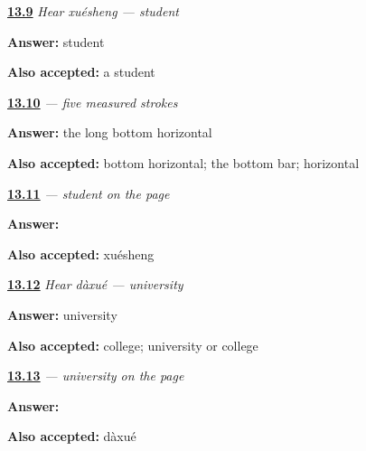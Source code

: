\noindent\begin{minipage}[t]{\linewidth}
\raggedright
\hyperlink{review-ZH-C13-hear-xuesheng-meaning}{\textbf{13.9}} \emph{Hear \emph{xuésheng} — student}\par
\small \textbf{Answer:} student\par
\footnotesize \textbf{Also accepted:} a student
\end{minipage}\par\medskip

\noindent\begin{minipage}[t]{\linewidth}
\raggedright
\hyperlink{review-ZH-W13-sheng-order}{\textbf{13.10}} \emph{ — five measured strokes}\par
\small \textbf{Answer:} the long bottom horizontal\par
\footnotesize \textbf{Also accepted:} bottom horizontal; the bottom bar; horizontal
\end{minipage}\par\medskip

\noindent\begin{minipage}[t]{\linewidth}
\raggedright
\hyperlink{review-ZH-C13-xuesheng-write}{\textbf{13.11}} \emph{ — student on the page}\par
\small \textbf{Answer:} \par
\footnotesize \textbf{Also accepted:}  xuésheng
\end{minipage}\par\medskip

\noindent\begin{minipage}[t]{\linewidth}
\raggedright
\hyperlink{review-ZH-C13-hear-daxue-meaning}{\textbf{13.12}} \emph{Hear \emph{dàxué} — university}\par
\small \textbf{Answer:} university\par
\footnotesize \textbf{Also accepted:} college; university or college
\end{minipage}\par\medskip

\noindent\begin{minipage}[t]{\linewidth}
\raggedright
\hyperlink{review-ZH-C13-daxue-write}{\textbf{13.13}} \emph{ — university on the page}\par
\small \textbf{Answer:} \par
\footnotesize \textbf{Also accepted:}  dàxué
\end{minipage}\par\medskip

